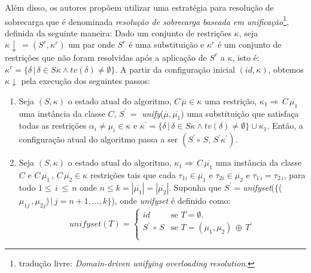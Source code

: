  Al\'em disso, os autores prop\~oem utilizar uma estrat\'egia para resolu\c{c}\~ao de sobrecarga que \'e denominada 
 \emph{resolu\c{c}\~ao de sobrecarga baseada em unifica\c{c}\~ao}\footnote{tradu\c{c}\~ao livre: 
 \emph{Domain-driven unifying overloading resolution}.}, definida da seguinte maneira: 
 Dado um conjunto de restri\c{c}\~oes $\kappa$, seja $\kappa\downarrow\, = (S^{r},\kappa^{r})$ um par onde $S^{r}$ 
 \'e uma substitui\c{c}\~ao e $\kappa^{r}$ \'e um conjunto
de restri\c{c}\~oes que n\~ao foram resolvidas ap\'os a aplica\c{c}\~ao de $S^{r}$ a $\kappa$, 
isto \'e: $\kappa^{r} = \{\delta\,|\,\delta\in S\kappa\land tv(\delta)\neq\emptyset\}$. A partir da configura\c{c}\~ao
inicial $(id,\kappa)$, obtemos $\kappa\downarrow$ pela execu\c{c}\~ao dos seguintes passos:
\begin{enumerate}
	\item Seja $(S,\kappa)$ o estado atual do algoritmo, 
	      $C\,\overline{\mu}\in\kappa$ uma restri\c{c}\~ao, $\kappa_{1}\Rightarrow\,C\,\overline{\mu_{1}}$ uma 
	      inst\^ancia da classe $C$, $S^{\prime}\,=$ \emph{unify}($\overline{\mu},\overline{\mu_{1}}$) 
	      uma substitui\c{c}\~ao que satisfa\c{c}a todas as restri\c{c}\~oes $\alpha_{i}\neq\mu_{i}\in\kappa$ e 
	      $\kappa^{\prime}=\{\delta\,|\,\delta\in S\kappa\land tv(\delta)\neq\emptyset\}\cup\kappa_{1}$. Ent\~ao,
	      a configura\c{c}\~ao atual do algoritmo passa a ser $(S^{\prime}\circ\,S,\,S^{\prime}\kappa^{\prime})$.
	\item Seja $(S,\kappa)$ o estado atual do algoritmo, $\kappa_{1}\Rightarrow\,C\,\overline{\mu_{1}}$ uma inst\^ancia
	      da classe $C$ e $C\,\overline{\mu_{1}}\,,\,C\,\overline{\mu_{2}}\in\kappa$ restri\c{c}\~oes 
	      tais que 
	      cada $\tau_{1i}\in\overline{\mu_{1}}$ e $\tau_{2i}\in\overline{\mu_{2}}$ e 
	      $\tau_{1\,i}=\tau_{2\,i}$, para todo $1\leq\,i\,\leq\,n$ onde 
	      $n \leq k = |\overline{\mu_{1}}| = |\overline{\mu_{2}}|$. Suponha que 
	      $S^{\prime}=$\emph{unifyset}($\{$($\mu_{1j}\,,\mu_{2j}$)$\,|\,j=n+1,\hdots,k\}$), onde \emph{unifyset} \'e
	      definido como:
	      \begin{equation*}
	      	unifyset(T) =\left\{
	      					\begin{array}{ll}
	      						id & \text{se } T = \emptyset.\\
	      						S^{\prime}\, \circ\, S & \text{se } T = (\mu_{1},\mu_{2})\,\oplus\, T^{\prime} \\
	      					\end{array}
	      	             \right. 

\end{equation*}
\end{enumerate}
